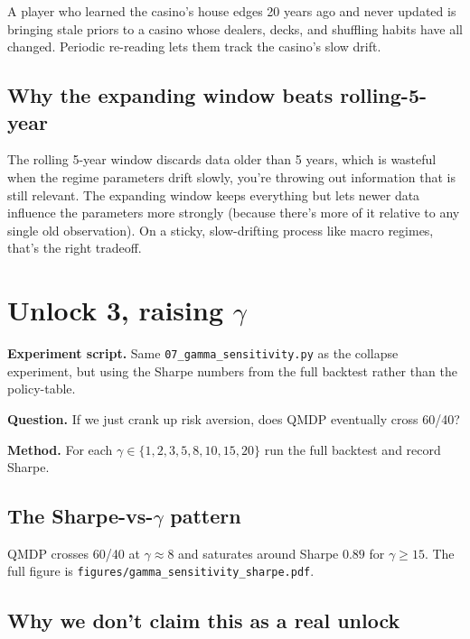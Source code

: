 \documentclass[11pt]{article}
\begin{document}
\begin{analogy}
A player who learned the casino's house edges 20 years ago and never updated is bringing stale priors to a casino whose dealers, decks, and shuffling habits have all changed. Periodic re-reading lets them track the casino's slow drift.
\end{analogy}

\subsection{Why the expanding window beats rolling-5-year}

The rolling 5-year window discards data older than 5 years, which is wasteful when the regime parameters drift slowly, you're throwing out information that is still relevant. The expanding window keeps everything but lets newer data influence the parameters more strongly (because there's more of it relative to any single old observation). On a sticky, slow-drifting process like macro regimes, that's the right tradeoff.

\section{Unlock 3, raising $\gamma$}

\textbf{Experiment script.} Same \texttt{07\_gamma\_sensitivity.py} as the collapse experiment, but using the Sharpe numbers from the full backtest rather than the policy-table.

\textbf{Question.} If we just crank up risk aversion, does QMDP eventually cross 60/40?

\textbf{Method.} For each $\gamma \in \{1, 2, 3, 5, 8, 10, 15, 20\}$ run the full backtest and record Sharpe.

\subsection{The Sharpe-vs-$\gamma$ pattern}

QMDP crosses 60/40 at $\gamma \approx 8$ and saturates around Sharpe $0.89$ for $\gamma \geq 15$. The full figure is \texttt{figures/gamma\_sensitivity\_sharpe.pdf}.

\subsection{Why we don't claim this as a real unlock}
\end{document}
